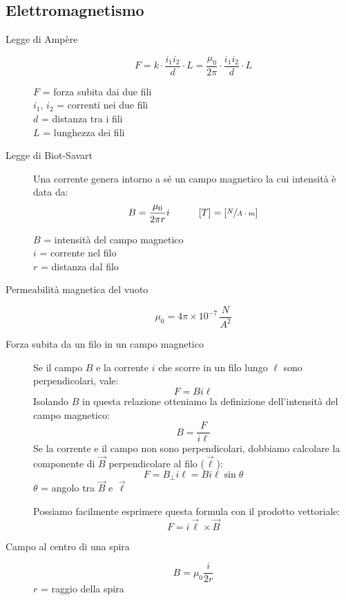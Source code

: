\documentclass[a4paper,11pt,italian]{article}
\begin{document}
\subsection{Elettromagnetismo}

\begin{description}
  \item[Legge di Ampère]
  \[ F = k\cdot  \frac{i_1 i_2}{d}\cdot L = \frac{\mu_0}{2\pi} \cdot \frac{i_1 i_2}{d}\cdot L \]
  \begin{multicols}{2}
  $ F $ = forza subita dai due fili\\
  $ i_1 $, $ i_2 $ = correnti nei due fili\\
  $ d $ = distanza tra i fili\\
  $ L $ = lunghezza dei fili
  \end{multicols}
  
  \item[Legge di Biot-Savart] 
  Una corrente genera intorno a sé un campo magnetico la cui intensità è data da:
  \[ B = \frac{\mu_0}{2\pi r} i \hspace*{3em} [T] = \left[ \sfrac{N}{A\cdot m} \right] \]
  \begin{multicols}{2}
  $ B $ = intensità del campo magnetico\\
  $ i $ = corrente nel filo\\
  $ r $ = distanza dal filo
  \end{multicols}
  
  \item[Permeabilità magnetica del vuoto]
  \[ \mu_0 = 4\pi \times 10^{-7} \, \frac{N}{A^2} \]
  
  \item[Forza subita da un filo in un campo magnetico] 
  Se il campo $ B $ e la corrente $ i $ che scorre in un filo lungo $ \ell $ sono perpendicolari, vale:\[ F = Bi\ell \]
  Isolando $ B $ in questa relazione otteniamo la definizione dell'intensità del campo magnetico:
  \[ B = \frac{F}{i\ell} \]
  Se la corrente e il campo non sono perpendicolari, dobbiamo calcolare la componente di $ \vec{B} $ perpendicolare al filo ($ \vec{\ell} $):
  \[ F = B_{\perp } i\ell = Bi\ell\sin\theta\]
  $ \theta $ = angolo tra $ \vec{B} $ e $ \vec{\ell} $
  
  Possiamo facilmente esprimere questa formula con il prodotto vettoriale:
  \[ F = i \vec{\ell} \times \vec{B} \]
  
  \item[Campo al centro di una spira]
  \[ B = \mu_0 \frac{i}{2r} \]
  $ r $ = raggio della spira
  

\end{description}
\end{document}
